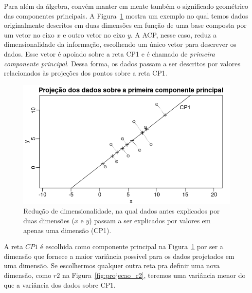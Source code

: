 \documentclass[
	article,			%
	12pt,				%
	oneside,			%
	a4paper,			%
	english,			%
	brazil,				%
	sumario=tradicional,
	oldfontcommands %
	]{abntex2}
\begin{document}
Para além da álgebra, convém manter em mente também o significado geométrico das componentes principais. A Figura~\ref{fig:projecao_cp1} mostra um exemplo no qual temos dados originalmente descritos em duas dimensões em função de uma base composta por um vetor no eixo $x$ e outro vetor no eixo $y$. A ACP, nesse caso, reduz a dimensionalidade da informação, escolhendo um único vetor para descrever os dados. Esse vetor é apoiado sobre a reta CP1 e é chamado de \emph{primeira componente principal}. Dessa forma, os dados passam a ser descritos por valores relacionados às projeções dos pontos sobre a reta CP1. 

\begin{figure}[h]
  \centering
  \includegraphics[scale=0.7]{figs/projecao_cp1.png}
  \caption{Redução de dimensionalidade, na qual dados antes explicados por duas dimensões ($x$ e $y$) passam a ser explicados por valores em apenas uma dimensão (CP1).}
  \label{fig:projecao_cp1}
\end{figure}

A reta $CP1$ é escolhida como componente principal na Figura~\ref{fig:projecao_cp1} por ser a dimensão que fornece a maior variância possível para os dados projetados em uma dimensão. Se escolhermos qualquer outra reta pra definir uma nova dimensão, como $r2$ na Figura~\ref{fig:projecao_r2}, teremos uma variância menor do que a variância dos dados sobre CP1.
\end{document}
